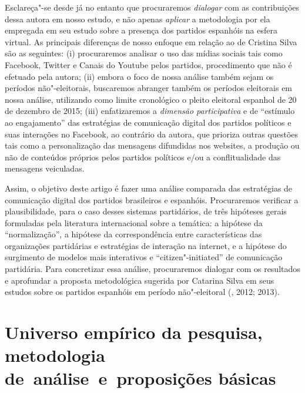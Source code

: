 Esclareça"-se desde já no entanto que procuraremos \emph{dialogar} com as
contribuições dessa autora em nosso estudo, e não apenas \emph{aplicar}
a metodologia por ela empregada em seu estudo sobre a presença dos
partidos espanhóis na esfera virtual. As principais diferenças de nosso
enfoque em relação ao de Cristina Silva são as seguintes: (i)
procuraremos analisar o uso das mídias sociais tais como Facebook,
Twitter e Canais do Youtube pelos partidos, procedimento que não é
efetuado pela autora; (ii) embora o foco de nossa análise também sejam
os períodos não"-eleitorais, buscaremos abranger também os períodos
eleitorais em nossa análise, utilizando como limite cronológico o pleito
eleitoral espanhol de 20 de dezembro de 2015; (iii) enfatizaremos a
\emph{dimensão participativa} e de ``estímulo ao engajamento'' das
estratégias de comunicação digital dos partidos políticos e suas
interações no Facebook, ao contrário da autora, que prioriza outras
questões tais como a personalização das mensagens difundidas nos
websites, a produção ou não de conteúdos próprios pelos partidos
políticos e/ou a conflitualidade das mensagens veiculadas.

Assim, o objetivo deste artigo é fazer uma análise comparada das
estratégias de comunicação digital dos partidos brasileiros e espanhóis.
Procuraremos verificar a plausibilidade, para o caso desses sistemas
partidários, de três hipóteses gerais formuladas pela literatura
internacional sobre a temática: a hipótese da ``normalização'', a
hipótese da correspondência entre características das organizações
partidárias e estratégias de interação na internet, e a hipótese do
surgimento de modelos mais interativos e ``citizen"-initiated'' de
comunicação partidária. Para concretizar essa análise, procuraremos
dialogar com os resultados e aprofundar a proposta metodológica sugerida
por Catarina Silva em seus estudos sobre os partidos espanhóis em
período não"-eleitoral (, 2012; 2013).

\section{Universo empírico da pesquisa, metodologia de~análise~e~proposições básicas}

